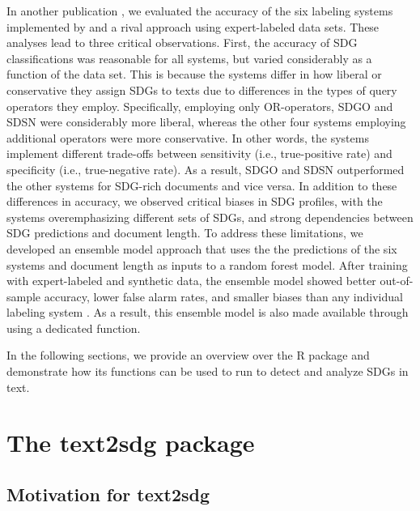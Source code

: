  In another publication \citep{wulff2023using}, we evaluated the accuracy of the six labeling systems implemented by  and a rival approach \citep[i.e., OSDG][]{pukelis2020osdg} using expert-labeled data sets. These analyses lead to three critical observations. First, the accuracy of SDG classifications was reasonable for all systems, but varied considerably as a function of the data set. This is because the systems differ in how liberal or conservative they assign SDGs to texts due to differences in the types of query operators they employ. Specifically, employing only OR-operators, SDGO and SDSN were considerably more liberal, whereas the other four systems employing additional operators were more conservative. In other words, the systems implement different trade-offs between sensitivity (i.e., true-positive rate) and specificity (i.e., true-negative rate). As a result, SDGO and SDSN outperformed the other systems for SDG-rich documents and vice versa. In addition to these differences in accuracy, we observed critical biases in SDG profiles, with the systems overemphasizing different sets of SDGs, and strong dependencies between SDG predictions and document length. To address these limitations, we developed an ensemble model approach that uses the the predictions of the six systems and document length as inputs to a random forest model. After training with expert-labeled and synthetic data, the ensemble model showed better out-of-sample accuracy, lower false alarm rates, and smaller biases than any individual labeling system \cite{wulff2023using}. As a result, this ensemble model is also made available through  using a dedicated function.
 
 In the following sections, we provide an overview over the  R package and demonstrate how its functions can be used to run to detect and analyze SDGs in text.
 
\section{The text2sdg package}

\subsection{Motivation for text2sdg}

